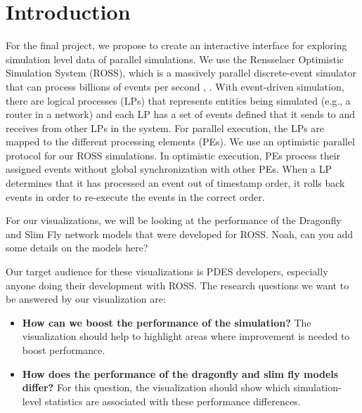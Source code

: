 \documentclass{acm_proc_article-sp}
\begin{document}
\maketitle
%
%

%
%


%
%

%
%



\section{Introduction}
For the final project, we propose to create an interactive interface for exploring simulation level data of parallel simulations.  We use the Rensselaer Optimistic Simulation System (ROSS), which is a massively parallel discrete-event simulator that can process billions of events per second \cite{Holder}, \cite{Bauer}.  With event-driven simulation, there are logical processes (LPs) that represents entities being simulated (e.g., a router in a network) and each LP has a set of events defined that it sends to and receives from other LPs in the system.  For parallel execution, the LPs are mapped to the different processing elements (PEs). We use an optimistic parallel protocol for our ROSS simulations.  In optimistic execution, PEs process their assigned events without global synchronization with other PEs.  When a LP determines that it has processed an event out of timestamp order, it rolls back events in order to re-execute the events in the correct order.

For our visualizations, we will be looking at the performance of the Dragonfly and Slim Fly network models that were developed for ROSS.  
\color{red}Noah, can you add some details on the models here? \color{black}

Our target audience for these visualizations is PDES developers, especially anyone doing their development with ROSS.  The research questions we want to be answered by our visualization are:
\begin{itemize}
\item \textbf{How can we boost the performance of the simulation?} The visualization should help to highlight areas where improvement is needed to boost performance.
\item  \textbf{How does the performance of the dragonfly and slim fly models differ?}  For this question, the visualization should show which simulation-level statistics are associated with these performance differences.
\end{itemize}
\end{document}
